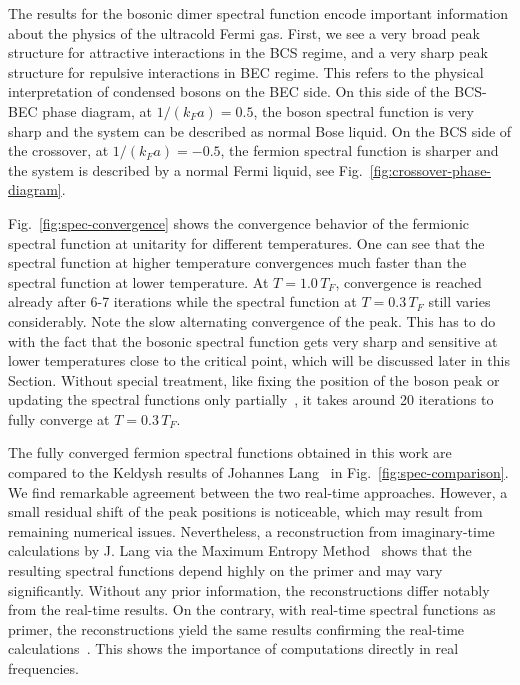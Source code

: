 The results for the bosonic dimer spectral function encode important information about the physics of the ultracold Fermi gas. First, we see a very broad peak structure for attractive interactions in the BCS regime, and a very sharp peak structure for repulsive interactions in BEC regime. This refers to the physical interpretation of condensed bosons on the BEC side. On this side of the BCS-BEC phase diagram, at $1/(k_Fa)=0.5$, the boson spectral function is very sharp and the system can be described as normal Bose liquid. On the BCS side of the crossover, at $1/(k_Fa)=-0.5$, the fermion spectral function is sharper and the system is described by a normal Fermi liquid, see Fig.~\ref{fig:crossover-phase-diagram}.

Fig.~\ref{fig:spec-convergence} shows the convergence behavior of the fermionic spectral function at unitarity for different temperatures. One can see that the spectral function at higher temperature convergences much faster than the spectral function at lower temperature. At $T=1.0\,T_F$, convergence is reached already after 6-7 iterations while the spectral function at $T=0.3\,T_F$ still varies considerably. Note the slow alternating convergence of the peak. This has to do with the fact that the bosonic spectral function gets very sharp and sensitive at lower temperatures close to the critical point, which will be discussed later in this Section. Without special treatment, like fixing the position of the boson peak or updating the spectral functions only partially~\cite{Frank2018}, it takes around 20 iterations to fully converge at $T=0.3\,T_F$. 

The fully converged fermion spectral functions obtained in this work are compared to the Keldysh results of Johannes Lang~\cite{Lang2023} in Fig.~\ref{fig:spec-comparison}. We find remarkable agreement between the two real-time approaches. However, a small residual shift of the peak positions is noticeable, which may result from remaining numerical issues. Nevertheless, a reconstruction from imaginary-time calculations by J. Lang via the Maximum Entropy Method~\cite{Jarrell2012} shows that the resulting spectral functions depend highly on the primer and may vary significantly. Without any prior information, the reconstructions differ notably from the real-time results. On the contrary, with real-time spectral functions as primer, the reconstructions yield the same results confirming the real-time calculations~\cite{Lang2023}. This shows the importance of computations directly in real frequencies.


